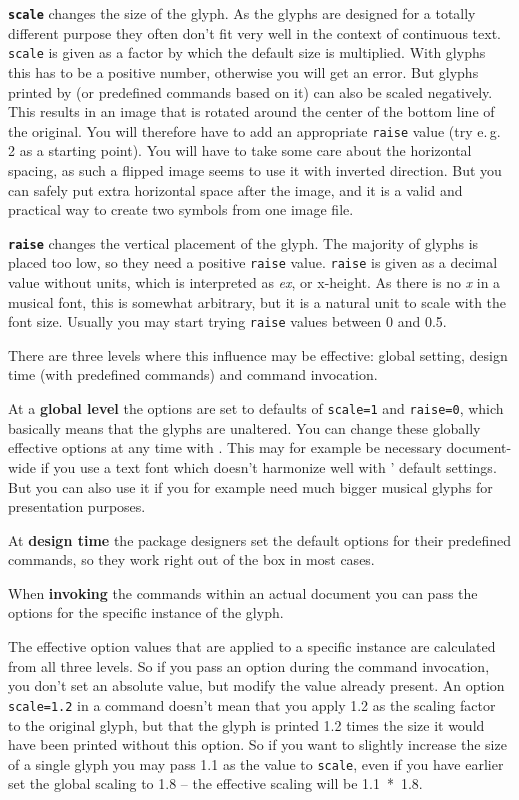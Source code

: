 \documentclass{article}
\begin{document}
\medskip
\texttt{\textbf{scale}} changes the size of the glyph. 
As the \emmentaler glyphs are designed for a totally different purpose they often don't fit very well in the context of continuous text.
\texttt{scale} is given as a factor by which the default size is multiplied.
With \emmentaler glyphs this has to be a positive number, otherwise you will get an error.
But glyphs printed by  (or predefined commands based on it) can also be scaled negatively.
This results in an image that is rotated around the center of the bottom line of the original.
You will therefore have to add an appropriate \texttt{raise} value (try e.\,g. 2 as a starting point).
You will have to take some care about the horizontal spacing, as such a flipped image seems to use it with inverted direction.
But you can safely put extra horizontal space after the image, and it is a valid and practical way to create two symbols from one image file.


\medskip
\texttt{\textbf{raise}} changes the vertical placement of the glyph.
The majority of glyphs is placed too low, so they need a positive \texttt{raise} value.
\texttt{raise} is given as a decimal value without units, which is interpreted as \emph{ex}, or x-height. 
As there is no \emph{x} in a musical font, this is somewhat arbitrary, but it is a natural unit to scale with the font size.
Usually you may start trying \texttt{raise} values between 0 and 0.5.

\medskip
There are three levels where this influence may be effective: global setting, design time (with predefined commands) and command invocation.

At a \textbf{global level} the options are set to defaults of \texttt{scale=1} and \texttt{raise=0}, which basically means that the glyphs are unaltered.
You can change these globally effective options at any time with .
This may for example be necessary document-wide if you use a text font which doesn't harmonize well with \lilyglyphs' default settings.
But you can also use it if you for example need much bigger musical glyphs for presentation purposes.

At \textbf{design time} the package designers set the default options for their predefined commands, so they work right out of the box in most cases.

When \textbf{invoking} the commands within an actual document you can pass the options for the specific instance of the glyph.

The effective option values that are applied to a specific instance are calculated from all three levels. 
So if you pass an option during the command invocation, you don't set an absolute value, but modify the value already present. 
An option \texttt{scale=1.2} in a command doesn't mean that you apply 1.2 as the scaling factor to the original glyph, but that the glyph is printed 1.2 times the size it would have been printed without this option.
So if you want to slightly increase the size of a single glyph you may pass 1.1 as the value to \texttt{scale}, even if you have earlier set the global scaling to 1.8 -- the effective scaling will be \mbox{1.1 * 1.8.}
\end{document}
